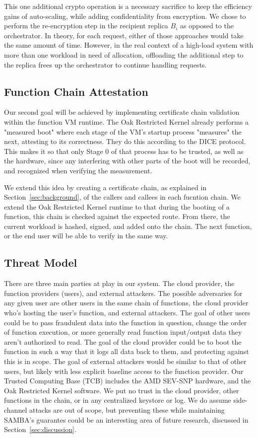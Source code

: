 This one additional crypto operation is a necessary sacrifice to keep the efficiency gains of auto-scaling, while adding confidentiality from encryption.
We chose to perform the re-encryption step in the recipient replica $B_i$ as opposed to the orchestrator.
In theory, for each request, either of those approaches would take the same amount of time.
However, in the real context of a high-load system with more than one workload in need of allocation, offloading the additional step to the replica frees up the orchestrator to continue handling requests.


\subsection{Function Chain Attestation}

Our second goal will be achieved by implementing certificate chain validation within the function VM runtime.
The Oak Restricted Kernel already performs a "measured boot" where each stage of the VM's startup process "measures" the next, attesting to its correctness.
They do this according to the DICE protocol.
This makes it so that only Stage 0 of that process has to be trusted, as well as the hardware, since any interfering with other parts of the boot will be recorded, and recognized when verifying the measurement.

We extend this idea by creating a certificate chain, as explained in Section~\ref{sec:background}, of the callers and callees in each fucntion chain.
We extend the Oak Restricted Kernel runtime to that during the booting of a function, this chain is checked against the expected route.
From there, the current workload is hashed, signed, and added onto the chain.
The next function, or the end user will be able to verify in the same way.

\subsection{Threat Model}

There are three main parties at play in our system. The cloud provider, the function providers (users), and external attackers.
The possible adversaries for any given user are other users in the same chain of functions, the cloud provider who's hosting the user's function, and external attackers.
The goal of other users could be to pass fraudulent data into the function in question, change the order of function execution, or more generally read function input/output data they aren't authorized to read.
The goal of the cloud provider could be to boot the function in such a way that it logs all data back to them, and protecting against this is in scope.
The goal of external attackers would be similar to that of other users, but likely with less explicit baseline access to the function provider.
Our Trusted Computing Base (TCB) includes the AMD SEV-SNP hardware, and the Oak Restricted Kernel software.
We put no trust in the cloud provider, other functions in the chain, or in any centralized keystore or log.
We do assume side-channel attacks are out of scope, but preventing these while maintaining SAMBA's guarantes could be an interesting area of future research, discussed in Section~\ref{sec:discussion}.

